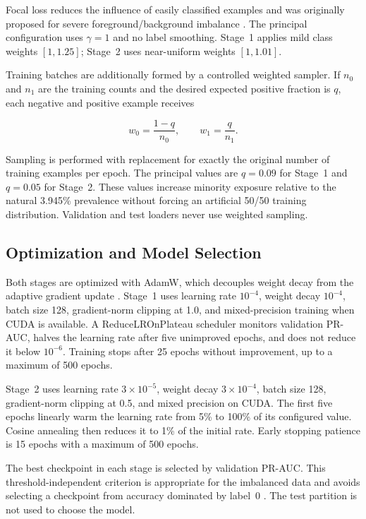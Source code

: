 \documentclass[11pt,fleqn]{report}
\begin{document}
Focal loss reduces the influence of easily classified examples and was
originally proposed for severe foreground/background imbalance
\cite{Lin2017FocalLoss}. The principal configuration uses $\gamma=1$ and no
label smoothing. Stage~1 applies mild class weights $[1,1.25]$; Stage~2 uses
near-uniform weights $[1,1.01]$.

Training batches are additionally formed by a controlled weighted sampler. If
$n_0$ and $n_1$ are the training counts and the desired expected positive
fraction is $q$, each negative and positive example receives

\begin{equation}
    w_0=\frac{1-q}{n_0},
    \qquad
    w_1=\frac{q}{n_1}.
    \label{eq:controlled_sampler}
\end{equation}

Sampling is performed with replacement for exactly the original number of
training examples per epoch. The principal values are $q=0.09$ for Stage~1 and
$q=0.05$ for Stage~2. These values increase minority exposure relative to the
natural 3.945\% prevalence without forcing an artificial 50/50 training
distribution. Validation and test loaders never use weighted sampling.

\subsection{Optimization and Model Selection}
\label{subsubsec:optimization}

Both stages are optimized with AdamW, which decouples weight decay from the
adaptive gradient update \cite{Loshchilov2019AdamW}. Stage~1 uses learning rate
$10^{-4}$, weight decay $10^{-4}$, batch size 128, gradient-norm clipping at
1.0, and mixed-precision training when CUDA is available. A
ReduceLROnPlateau scheduler monitors validation PR-AUC, halves the learning rate
after five unimproved epochs, and does not reduce it below $10^{-6}$. Training
stops after 25 epochs without improvement, up to a maximum of 500 epochs.

Stage~2 uses learning rate $3\times10^{-5}$, weight decay
$3\times10^{-4}$, batch size 128, gradient-norm clipping at 0.5, and mixed
precision on CUDA. The first five epochs linearly warm the learning rate from
5\% to 100\% of its configured value. Cosine annealing then reduces it to 1\%
of the initial rate. Early stopping patience is 15 epochs with a maximum of 500
epochs.

The best checkpoint in each stage is selected by validation PR-AUC. This
threshold-independent criterion is appropriate for the imbalanced data and
avoids selecting a checkpoint from accuracy dominated by label~0
\cite{SaitoRehmsmeier2015}. The test partition is not used to choose the model.
% 
\end{document}
